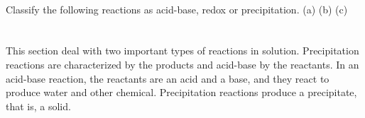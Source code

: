 \documentclass[main.tex]{subfiles}
\begin{document}
\begin{description}
\begin{example}
\faDiamond\ \\
Classify the following reactions as acid-base, redox or precipitation.
(a)  
(b)    
(c)    
\end{example}%




\end{description}




\section{\color{blue!30!black}{Precipitation reactions and acid-base reactions}}
This section deal with two important types of reactions in solution. Precipitation reactions are characterized by the products and acid-base by the reactants. In an acid-base reaction, the reactants are an acid and a base, and they react to produce water and other chemical. Precipitation reactions produce a precipitate, that is, a solid.
\sloppy 
\end{document}
